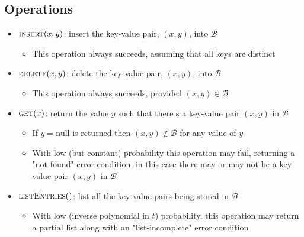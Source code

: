 \subsection{Operations}
\begin{itemize}
	\item $\textsc{insert}(x,y)$: insert the key-value pair, $(x,y)$, into $\mathcal B$
  \begin{itemize}
  	\item This operation always succeeds, assuming that all keys are distinct
  \end{itemize}
	\item $\textsc{delete}(x,y)$: delete the key-value pair, $(x,y)$, into $\mathcal B$
  \begin{itemize}
  	\item This operation always succeeds, provided $(x,y) \in \mathcal B$
  \end{itemize}
	\item $\textsc{get}(x)$: return the value $y$ such that there s a key-value pair $(x,y)$ in $\mathcal B$
  \begin{itemize}
		\item If $y = \text{null}$ is returned then $(x,y) \notin \mathcal B$ for any value of $y$
		\item With low (but constant) probability this operation may fail, returning a "not found" error condition, in this case there may or may not be a key-value pair $(x,y)$ in $\mathcal B$
  \end{itemize}
	\item $\textsc{listEntries}()$: list all the key-value pairs being stored in $\mathcal B$
  \begin{itemize}
		\item With low (inverse polynomial in $t$) probability, this operation may return a partial list along with an "list-incomplete" error condition
  \end{itemize}



\end{itemize}
